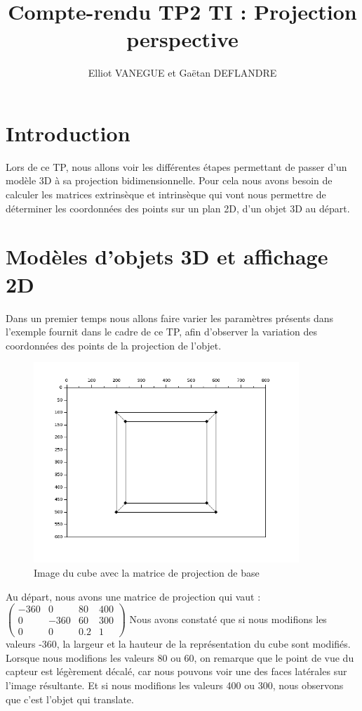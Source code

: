 \documentclass[a4paper,11pt]{article}
\title{Compte-rendu TP2 TI : Projection perspective}
\author{Elliot VANEGUE et Gaëtan DEFLANDRE}
\begin{document}


  \maketitle
  
  \mbox{}
  \newpage
  \clearpage
  
  \section*{Introduction}
  Lors de ce TP, nous allons voir les différentes étapes permettant de passer d'un
  modèle 3D à sa projection bidimensionnelle. Pour cela nous avons besoin de calculer les matrices 
  extrinsèque et intrinsèque qui vont nous permettre de déterminer les coordonnées des points
  sur un plan 2D, d'un objet 3D au départ.
  
  \section{Modèles d'objets 3D et affichage 2D}
  Dans un premier temps nous allons faire varier les paramètres présents dans l'exemple fournit
  dans le cadre de ce TP, afin d'observer la variation des coordonnées des points de la projection de l'objet.\\
  
  \begin{figure}[H]
    \center
    \includegraphics[width=10cm]{Projection1.png}
    \caption{Image du cube avec la matrice de projection de base}
  \end{figure}

  
  Au départ, nous avons une matrice de projection qui vaut : 
  $\begin{pmatrix}
   -360 & 0 & 80 & 400 \\
   0 & -360 & 60 & 300 \\
   0 & 0 & 0.2 & 1
  \end{pmatrix}$
  Nous avons constaté que si nous modifions les valeurs -360, la largeur et la hauteur de la représentation du cube sont modifiés.
  Lorsque nous modifions les valeurs 80 ou 60, on remarque que le point de vue du capteur est légèrement décalé, car nous pouvons 
  voir une des faces latérales sur l'image résultante. Et si nous modifions les valeurs 400 ou 300, nous observons que c'est l'objet qui translate.\\
  
\end{document}
